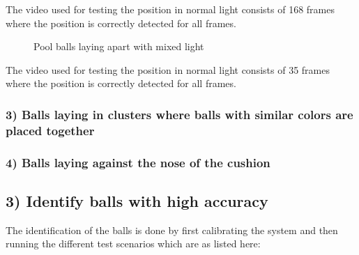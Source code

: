 The video used for testing the position in normal light consists of 168 frames where the position is correctly detected for all frames.

\begin{figure}[H]
  \centering
\quad
\quad
   \caption{Pool balls laying apart with mixed light}
  \label{fig:apartmixed}
\end{figure}

The video used for testing the position in normal light consists of 35 frames where the position is correctly detected for all frames.

\subsubsection{ 3) Balls laying in clusters where balls with similar colors are placed together}


\subsubsection{ 4) Balls laying against the nose of the cushion}


\subsection{3) Identify balls with high accuracy}

The identification of the balls is done by first calibrating the system and then running the different test scenarios which are as listed here:

